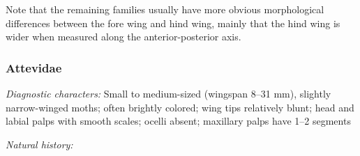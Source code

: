 \documentclass[letterpaper, 11pt]{article}
\begin{document}
\noindent{}Note that the remaining families usually have more obvious morphological differences between the fore wing and hind wing, mainly that the hind wing is wider when measured along the anterior-posterior axis.

\subsubsection{Attevidae}
\noindent{}\textit{Diagnostic characters:} Small to medium-sized (wingspan 8--31 mm), slightly narrow-winged moths; often brightly colored; wing tips relatively blunt; head and labial palps with smooth scales; ocelli absent; maxillary palps have 1--2 segments

\noindent{}\textit{Natural history:} 

\end{document}

